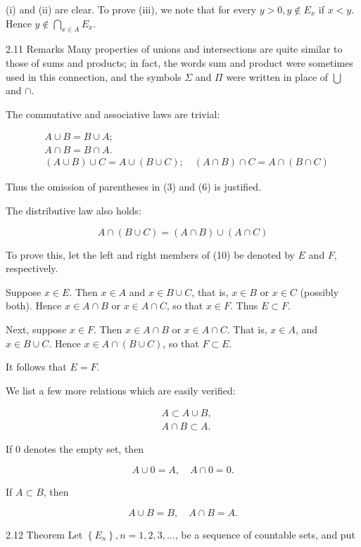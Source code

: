 \documentclass[10pt]{article}
\begin{document}
(i) and (ii) are clear. To prove (iii), we note that for every $y>0, y \notin E_{x}$ if $x<y$. Hence $y \notin \bigcap_{x \in A} E_{x}$.

2.11 Remarks Many properties of unions and intersections are quite similar to those of sums and products; in fact, the words sum and product were sometimes used in this connection, and the symbols $\Sigma$ and $\Pi$ were written in place of $\bigcup$ and $\cap$.

The commutative and associative laws are trivial:

$$
\begin{aligned}
& A \cup B=B \cup A ; \\
& A \cap B=B \cap A . \\
& (A \cup B) \cup C=A \cup(B \cup C) ; \quad(A \cap B) \cap C=A \cap(B \cap C)
\end{aligned}
$$

Thus the omission of parentheses in (3) and (6) is justified.

The distributive law also holds:

$$
A \cap(B \cup C)=(A \cap B) \cup(A \cap C)
$$

To prove this, let the left and right members of (10) be denoted by $E$ and $F$, respectively.

Suppose $x \in E$. Then $x \in A$ and $x \in B \cup C$, that is, $x \in B$ or $x \in C$ (possibly both). Hence $x \in A \cap B$ or $x \in A \cap C$, so that $x \in F$. Thus $E \subset F$.

Next, suppose $x \in F$. Then $x \in A \cap B$ or $x \in A \cap C$. That is, $x \in A$, and $x \in B \cup C$. Hence $x \in A \cap(B \cup C)$, so that $F \subset E$.

It follows that $E=F$.

We list a few more relations which are easily verified:

$$
\begin{aligned}
& A \subset A \cup B, \\
& A \cap B \subset A .
\end{aligned}
$$

If 0 denotes the empty set, then

$$
A \cup 0=A, \quad A \cap 0=0 .
$$

If $A \subset B$, then

$$
A \cup B=B, \quad A \cap B=A .
$$

2.12 Theorem Let $\left\{E_{n}\right\}, n=1,2,3, \ldots$, be a sequence of countable sets, and put
\end{document}
